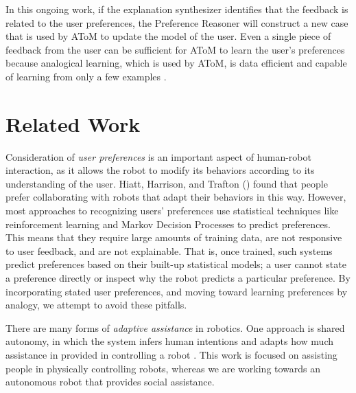 \documentclass[letterpaper]{article} %
\begin{document}
In this ongoing work, if the explanation synthesizer identifies that the feedback is related 
to the user preferences, the Preference Reasoner will construct a new
case that is used by AToM to update the model of the user.  Even a single
piece of feedback from the user can be sufficient for AToM to learn the 
user's preferences because analogical learning, which is used by AToM, is
data efficient and capable of learning from only a few examples 
\cite{chen2019human,wilson2019analogical}.


\section{Related Work}
Consideration of \textit{user preferences} is an important aspect of human-robot interaction, as it allows the robot to modify its behaviors according to its understanding of the user. Hiatt, Harrison, and Trafton (\citeyear{hiatt2011accommodating}) found that people prefer collaborating with robots that adapt their behaviors in this way. However, most approaches to recognizing users' preferences use statistical techniques like reinforcement learning \cite{woodworth2018preference} and Markov Decision Processes \cite{munzer2017preference} to predict preferences. This means that they require large amounts of training data, are not responsive to user feedback, and are not explainable. That is, once trained, such systems predict preferences based on their built-up statistical models; a user cannot state a preference directly or inspect why the robot predicts a particular preference. By incorporating stated user preferences, and moving toward learning preferences by analogy, we attempt to avoid these pitfalls.

There are many forms of \textit{adaptive assistance} in robotics.  One approach is 
shared autonomy, in which the system infers human intentions and adapts how
much assistance in provided in controlling a robot \cite{Nikolaidis2017,Jain2019}.
This work is focused on assisting people in physically controlling robots, 
whereas we are working towards an autonomous robot that provides social assistance.
\end{document}
